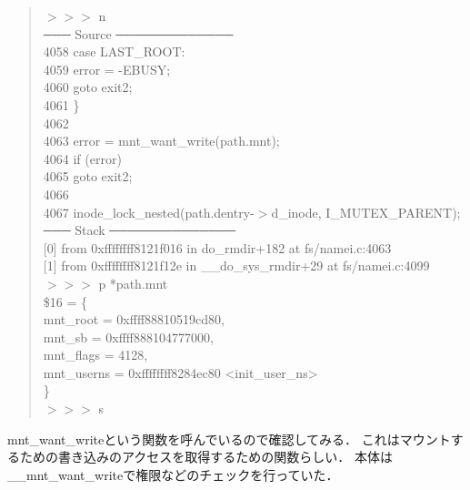 \begin{quote}
$>>>$ n \\
─── Source ─────────────
\\
 4058      case LAST\_ROOT: \\
 4059          error = -EBUSY; \\
 4060          goto exit2; \\
 4061      \} \\
 4062 \\
 4063      error = mnt\_want\_write(path.mnt); \\
 4064      if (error) \\
 4065          goto exit2; \\
 4066 \\
 4067      inode\_lock\_nested(path.dentry-$>$d\_inode, I\_MUTEX\_PARENT); \\
─── Stack ──────────────
\\
{[0]} from 0xffffffff8121f016 in do\_rmdir+182 at fs/namei.c:4063 \\
{[1]} from 0xffffffff8121f12e in \_\_do\_sys\_rmdir+29 at fs/namei.c:4099 \\
$>>>$ p *path.mnt \\
\$16 = \{ \\
  mnt\_root = 0xffff88810519cd80, \\
  mnt\_sb = 0xffff888104777000, \\
  mnt\_flags = 4128, \\
  mnt\_userns = 0xffffffff8284ec80 <init\_user\_ns> \\
\} \\
$>>>$ s
\end{quote}

mnt\_want\_writeという関数を呼んでいるので確認してみる．
これはマウントするための書き込みのアクセスを取得するための関数らしい．
本体は\_\_mnt\_want\_writeで権限などのチェックを行っていた．

